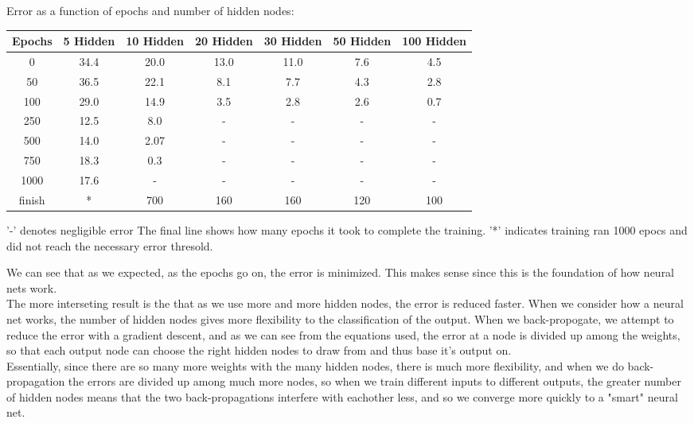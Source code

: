 \documentclass[12pt]{article}
\begin{document}
\vspace{1em}
Error as a function of epochs and number of hidden nodes:
\begin{center}
\begin{tabular}{|c|cccccc|}
\hline
Epochs & 5 Hidden & 10 Hidden & 20 Hidden & 30 Hidden & 50 Hidden & 100 Hidden\\
\hline
0    & 34.4 & 20.0 & 13.0 & 11.0 & 7.6 & 4.5 \\
50   & 36.5 & 22.1 &  8.1 &  7.7 & 4.3 & 2.8 \\
100  & 29.0 & 14.9 &  3.5 &  2.8 & 2.6 & 0.7 \\
250  & 12.5 &  8.0 &    - &    - &   - &   - \\
500  & 14.0 & 2.07 &    - &    - &   - &   - \\
750  & 18.3 &  0.3 &    - &    - &   - &   - \\
1000 & 17.6 &    - &    - &    - &   - &   - \\
finish  & * & 700  & 160  & 160  & 120 & 100 \\
\hline
\end{tabular}
\end{center}
'-' denotes negligible error
The final line shows how many epochs it took to complete the training.
'*' indicates training ran 1000 epocs and did not reach the necessary error
thresold.
\vspace{1em}

We can see that as we expected, as the epochs go on, the error is minimized.
This makes sense since this is the foundation of how neural nets work. \\

The more interseting result is the that as we use more and more hidden nodes,
the error is reduced faster.  When we consider how a neural net works, the
number of hidden nodes gives more flexibility to the classification of the
output.  When we back-propogate, we attempt to reduce the error with a gradient
descent, and as we can see from the equations used, the error at a node is
divided up among the weights, so that each output node can choose the right
hidden nodes to draw from and thus base it's output on. \\

Essentially, since there are so many more weights with the many hidden nodes,
there is much more flexibility, and when we do back-propagation the errors are
divided up among much more nodes, so when we train different inputs to different
outputs, the greater number of hidden nodes means that the two back-propagations
interfere with eachother less, and so we converge more quickly to a "smart"
neural net. \\
\end{document}
